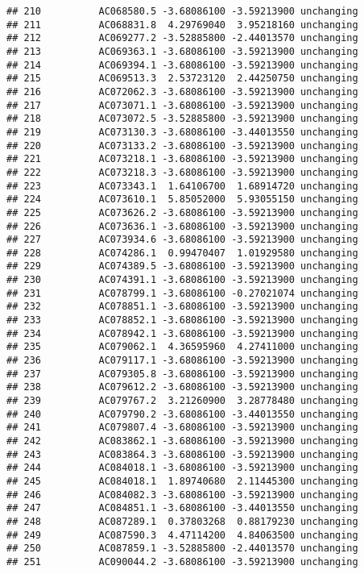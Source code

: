 \documentclass[]{article}
\begin{document}
\begin{verbatim}
## 210          AC068580.5 -3.68086100 -3.59213900 unchanging
## 211          AC068831.8  4.29769040  3.95218160 unchanging
## 212          AC069277.2 -3.52885800 -2.44013570 unchanging
## 213          AC069363.1 -3.68086100 -3.59213900 unchanging
## 214          AC069394.1 -3.68086100 -3.59213900 unchanging
## 215          AC069513.3  2.53723120  2.44250750 unchanging
## 216          AC072062.3 -3.68086100 -3.59213900 unchanging
## 217          AC073071.1 -3.68086100 -3.59213900 unchanging
## 218          AC073072.5 -3.52885800 -3.59213900 unchanging
## 219          AC073130.3 -3.68086100 -3.44013550 unchanging
## 220          AC073133.2 -3.68086100 -3.59213900 unchanging
## 221          AC073218.1 -3.68086100 -3.59213900 unchanging
## 222          AC073218.3 -3.68086100 -3.59213900 unchanging
## 223          AC073343.1  1.64106700  1.68914720 unchanging
## 224          AC073610.1  5.85052000  5.93055150 unchanging
## 225          AC073626.2 -3.68086100 -3.59213900 unchanging
## 226          AC073636.1 -3.68086100 -3.59213900 unchanging
## 227          AC073934.6 -3.68086100 -3.59213900 unchanging
## 228          AC074286.1  0.99470407  1.01929580 unchanging
## 229          AC074389.5 -3.68086100 -3.59213900 unchanging
## 230          AC074391.1 -3.68086100 -3.59213900 unchanging
## 231          AC078799.1 -3.68086100 -0.27021074 unchanging
## 232          AC078851.1 -3.68086100 -3.59213900 unchanging
## 233          AC078852.1 -3.68086100 -3.59213900 unchanging
## 234          AC078942.1 -3.68086100 -3.59213900 unchanging
## 235          AC079062.1  4.36595960  4.27411000 unchanging
## 236          AC079117.1 -3.68086100 -3.59213900 unchanging
## 237          AC079305.8 -3.68086100 -3.59213900 unchanging
## 238          AC079612.2 -3.68086100 -3.59213900 unchanging
## 239          AC079767.2  3.21260900  3.28778480 unchanging
## 240          AC079790.2 -3.68086100 -3.44013550 unchanging
## 241          AC079807.4 -3.68086100 -3.59213900 unchanging
## 242          AC083862.1 -3.68086100 -3.59213900 unchanging
## 243          AC083864.3 -3.68086100 -3.59213900 unchanging
## 244          AC084018.1 -3.68086100 -3.59213900 unchanging
## 245          AC084018.1  1.89740680  2.11445300 unchanging
## 246          AC084082.3 -3.68086100 -3.59213900 unchanging
## 247          AC084851.1 -3.68086100 -3.44013550 unchanging
## 248          AC087289.1  0.37803268  0.88179230 unchanging
## 249          AC087590.3  4.47114200  4.84063500 unchanging
## 250          AC087859.1 -3.52885800 -2.44013570 unchanging
## 251          AC090044.2 -3.68086100 -3.59213900 unchanging

\end{verbatim}
\end{document}
